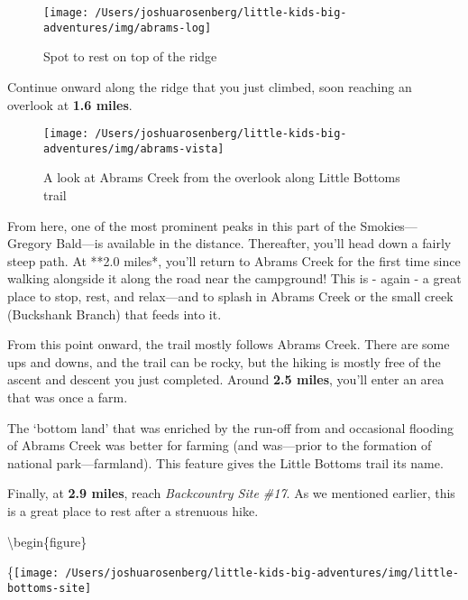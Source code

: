 \documentclass[
]{book}
\begin{document}
\begin{figure}

{\centering \texttt{[image: /Users/joshuarosenberg/little-kids-big-adventures/img/abrams-log]} 

}

\caption{Spot to rest on top of the ridge}\label{fig:unnamed-chunk-44}
\end{figure}

Continue onward along the ridge that you just climbed, soon reaching an
overlook at \textbf{1.6 miles}.

\begin{figure}

{\centering \texttt{[image: /Users/joshuarosenberg/little-kids-big-adventures/img/abrams-vista]} 

}

\caption{A look at Abrams Creek from the overlook along Little Bottoms trail}\label{fig:unnamed-chunk-45}
\end{figure}

From here, one of the most prominent peaks in this part of the
Smokies---Gregory Bald---is available in the distance. Thereafter, you'll head
down a fairly steep path. At **2.0 miles*, you'll return to Abrams Creek for
the first time since walking alongside it along the road near the campground!
This is - again - a great place to stop, rest, and relax---and to splash in
Abrams Creek or the small creek (Buckshank Branch) that feeds into it.

From this point onward, the trail mostly follows Abrams Creek. There are some
ups and downs, and the trail can be rocky, but the hiking is mostly free of the
ascent and descent you just completed. Around \textbf{2.5 miles}, you'll enter an
area that was once a farm.

\begin{rmdhistory}
The `bottom land' that was enriched by the run-off from and occasional
flooding of Abrams Creek was better for farming (and was---prior to the
formation of national park---farmland). This feature gives the Little
Bottoms trail its name.
\end{rmdhistory}

Finally, at \textbf{2.9 miles}, reach \emph{Backcountry Site \#17}. As we mentioned
earlier, this is a great place to rest after a strenuous hike.

\textbackslash begin\{figure\}

\{\centering \texttt{[image: /Users/joshuarosenberg/little-kids-big-adventures/img/little-bottoms-site]}
\end{document}
